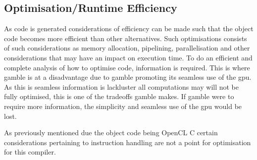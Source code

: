 \subsection*{Optimisation/Runtime Efficiency}
As code is generated considerations of efficiency can be made such that the object code becomes more efficient than other alternatives.
Such optimisations consists of such considerations as memory allocation, pipelining, parallelisation and other considerations that may have an impact on execution time.
To do an efficient and complete analysis of how to optimise code, information is required.
This is where \gls{gamble} is at a disadvantage due to \gls{gamble} promoting its seamless use of the \acrshort{gpu}.
As this is seamless information is lackluster all computations may will not be fully optimised, this is one of the tradeoffs \gls{gamble} makes.
If \gls{gamble} were to require more information, the simplicity and seamless use of the \acrshort{gpu} would be lost.

As previously mentioned due the object code being OpenCL C certain considerations pertaining to instruction handling are not a point for optimisation for this compiler.

